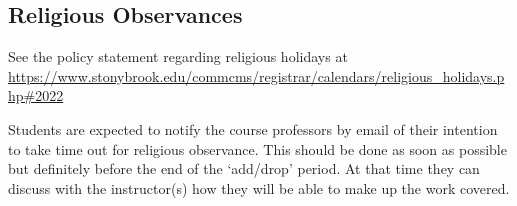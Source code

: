 \documentclass[10pt]{article}
\begin{document}
\subsection*{Religious Observances}

See the policy statement regarding religious holidays at\hfill\\
{\small \url{https://www.stonybrook.edu/commcms/registrar/calendars/religious_holidays.php#2022}} \linebreak
%

Students are expected to notify the course professors by email of
their intention to take time out for religious observance.  This
should be done as soon as possible but definitely before the end of
the `add/drop' period.  At that time they can discuss with the
instructor(s) how they will be able to make up the work covered.
\end{document}
